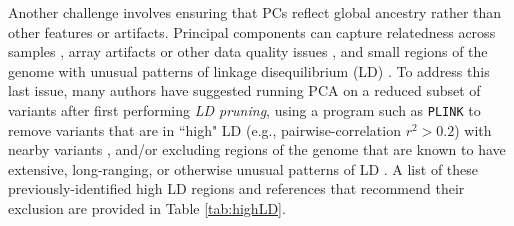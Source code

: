 \documentclass[12pt]{article}
\newcommand{\add}[1]{{\color{red}{[... #1 ...]}}}
\begin{document}
Another challenge involves ensuring that PCs reflect global ancestry rather than other features or artifacts. 
Principal components can capture relatedness across samples \citep{price2010, conomos2015, patterson2006, abdellaoui2013}, array artifacts or other data quality issues \citep{eigenstrat, price2010, patterson2006,  weale2010}, and small regions of the genome with unusual patterns of linkage disequilibrium (LD) \citep{eigenstrat, price2010, wellcome2007, patterson2006, abdellaoui2013, weale2010,   tian2008, price2008, zou2010, laurie2010, prive2020}. 
To address this last issue, many authors have suggested running PCA on a reduced subset of variants after first performing \textit{LD pruning}, using a program such as \texttt{PLINK} \citep{plink} to remove variants that are in ``high" LD (e.g., pairwise-correlation $r^2 > 0.2$) with nearby variants  \citep{conomos2016, wellcome2007,  fellay2007,  novembre2008, conomos2015, reed2015, daya2019,  abdellaoui2013, weale2010, laurie2010, yu2008, nelson2008, anderson2010, zhang2013, galinsky2016}, and/or excluding regions of the genome that are known to have extensive, long-ranging, or otherwise unusual patterns of LD \citep{conomos2016, wellcome2007, fellay2007, novembre2008, raska2012, weale2010,  price2008,  anderson2010}. 
A list of these previously-identified high LD regions and references that recommend their exclusion are provided in Table \ref{tab:highLD}.
\end{document}
